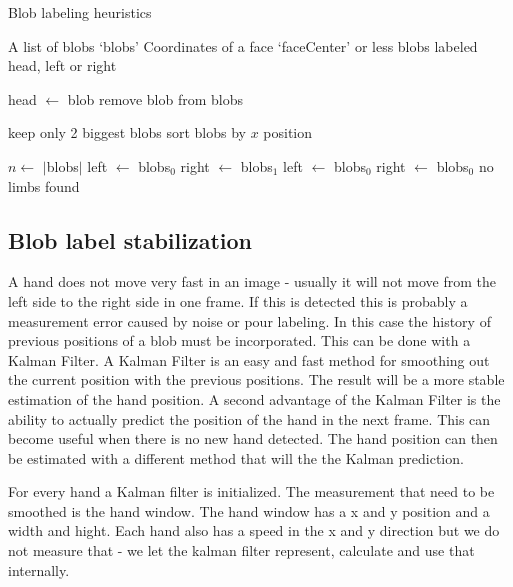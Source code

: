 \begin{algorithm}
\caption{Blob labeling heuristics}
\label{alg:blobheuristics}
\begin{algorithmic}
   \REQUIRE A list of blobs `blobs'
   \REQUIRE Coordinates of a face `faceCenter'
    or less blobs labeled head, left or right

			\STATE head $\leftarrow$ blob
			\STATE remove blob from blobs
		\ENDIF
	\ENDFOR

	\STATE keep only 2 biggest blobs
	\STATE sort blobs by $x$ position

	\STATE $n \leftarrow $ $|$blobs$|$
	    \STATE left $\leftarrow$ blobs$_0$
	    \STATE right $\leftarrow$ blobs$_1$
	\ELSE
		        \STATE left $\leftarrow$ blobs$_0$
		    \ELSE
		        \STATE right $\leftarrow$ blobs$_0$
			\ENDIF
		\ENDIF
	\ELSE
	    \STATE no limbs found
	\ENDIF
\end{algorithmic}
\end{algorithm}



\subsection*{Blob label stabilization}
A hand does not move very fast in an image - usually it will not move from the left side to the right side in one frame. If this is detected this is probably a measurement error caused by noise or pour labeling. In this case the history of previous positions of a blob must be incorporated. This can be done with a Kalman Filter. A Kalman Filter is an easy and fast method for smoothing out the current position with the previous positions. The result will be a more stable estimation of the hand position. A second advantage of the Kalman Filter is the ability to actually predict the position of the hand in the next frame. This can become useful when there is no new hand detected. The hand position can then be estimated with a different method that will the the Kalman prediction.

For every hand a Kalman filter is initialized. The measurement that need to be smoothed is the hand window. The hand window has a x and y position and a width and hight. Each hand also has a speed in the x and y direction but we do not measure that - we let the kalman filter represent, calculate and use that internally. 

